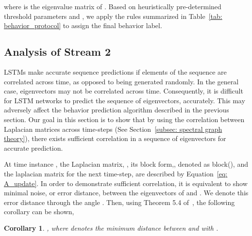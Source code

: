 \documentclass[10pt,twocolumn,letterpaper]{article}
\theoremstyle{plain}
\newtheorem{corollary}{Corollary}[section]
\begin{document}
\noindent where  is the eigenvalue matrix of . Based on heuristically pre-determined threshold parameters  and , we apply the rules summarized in Table~\ref{tab: behavior_protocol} to assign the final behavior label.
\begin{table}[t]
  \caption{\textbf{Behavior Definitions:} Definitions of the different types of road-agent behaviors.  are constant threshold parameters.}
  \label{tab: behavior_protocol}
  \centering
\vspace{-5pt}
\end{table}
 


\subsection{Analysis of Stream 2}
\label{subsec: analysis}


LSTMs make accurate sequence predictions if elements of the sequence are correlated across time, as opposed to being generated randomly. In the general case, eigenvectors may not be correlated across time. Consequently, it is difficult for LSTM networks to predict the sequence of eigenvectors,  accurately. This may adversely affect the behavior prediction algorithm described in the previous section. Our goal in this section is to show that by using the correlation between Laplacian matrices across time-steps (See Section~\ref{subsec: spectral graph theory}), there exists sufficient correlation in a sequence of eigenvectors for accurate prediction.

At time instance , the Laplacian matrix, , its block form,, denoted as block(), and the laplacian matrix for the next time-step,  are described by Equation~\ref{eq: A_update}. In order to demonstrate sufficient correlation, it is equivalent to show minimal noise, or error distance, between the  eigenvectors of  and . We denote this error distance through the angle . Then, using Theorem 5.4 of~\cite{demmel1997applied}, the following corollary can be shown,

\begin{corollary}
    , where  denotes the minimum distance between  and  with .
    \label{eq: theoretical_bound}
\end{corollary}
\end{document}
